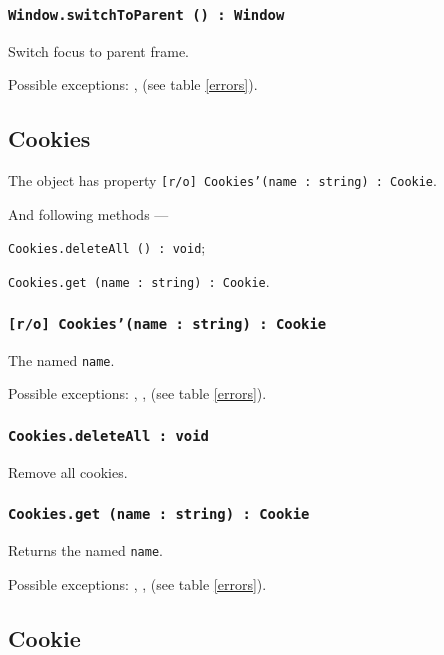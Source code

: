 \subsubsection{\texttt{Window.switchToParent () : Window}}

Switch focus to parent frame.

Possible exceptions: ,  (see table \ref{errors}).

\subsection{{\color{orange} Cookies}}

The object \cookies{} has property \texttt{[r/o] Cookies'(name : string) : Cookie}.

And following methods — 
\begin{icItems}
	\item \texttt{Cookies.deleteAll () : void};
	\item \texttt{Cookies.get (name : string) : Cookie}.
\end{icItems}

\subsubsection{\texttt{[r/o] Cookies'(name : string) : Cookie}}

The \cookie{} named \texttt{name}.

Possible exceptions: , ,  (see table \ref{errors}).

\subsubsection{\texttt{Cookies.deleteAll : void}}

Remove all cookies.

\subsubsection{\texttt{Cookies.get (name : string) : Cookie}}

Returns the \cookie{} named \texttt{name}.

Possible exceptions: , ,  (see table \ref{errors}).

\subsection{{\color{orange} Cookie}}

